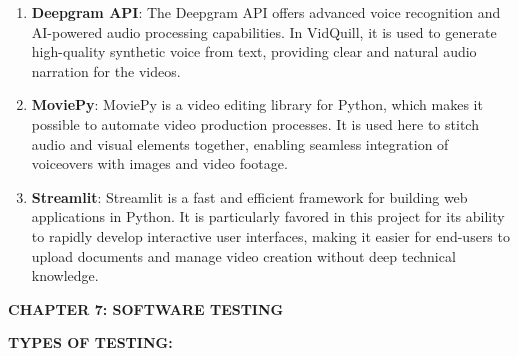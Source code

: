 \documentclass[12pt]{article}
\begin{document}
\begin{enumerate}
    \item \textbf{Deepgram API}: The Deepgram API offers advanced voice recognition and AI-powered audio processing capabilities. In VidQuill, it is used to generate high-quality synthetic voice from text, providing clear and natural audio narration for the videos.

    \item \textbf{MoviePy}: MoviePy is a video editing library for Python, which makes it possible to automate video production processes. It is used here to stitch audio and visual elements together, enabling seamless integration of voiceovers with images and video footage.

    \item \textbf{Streamlit}: Streamlit is a fast and efficient framework for building web applications in Python. It is particularly favored in this project for its ability to rapidly develop interactive user interfaces, making it easier for end-users to upload documents and manage video creation without deep technical knowledge.
\end{enumerate}

\pagebreak{}

\begin{center} \fontsize{14}{14} \textbf{CHAPTER 7: SOFTWARE TESTING} \end{center}
\justify \textbf{\fontsize{12}{12} TYPES OF TESTING: }
\end{document}
